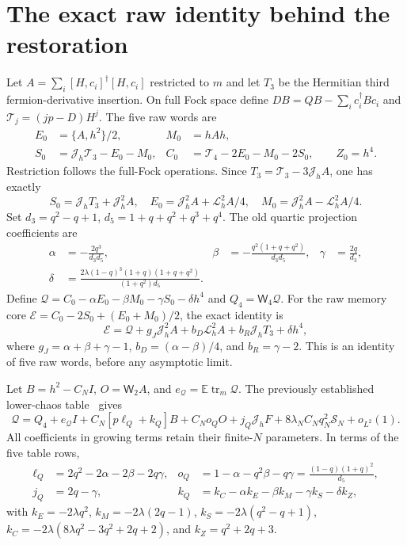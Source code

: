 \documentclass[11pt,a4paper]{article}
\newcommand{\EE}{\mathbb E}
\newcommand{\tr}{\operatorname{tr}}
\newcommand{\W}[1]{\mathsf W_{#1}}
\newcommand{\Jh}{\mathcal J_h}
\newcommand{\Lh}{\mathcal L_h}
\begin{document}
\section{The exact raw identity behind the restoration}
Let $A=\sum_i[H,c_i]^\dagger[H,c_i]$ restricted to $m$ and let
$T_3$ be the Hermitian third fermion-derivative insertion. On full
Fock space define $D B=QB-\sum_i c_i^\dagger Bc_i$ and
$\mathcal T_j=(jp-D)H^j$. The five raw words are
\begin{align}
 E_0&=\{A,h^2\}/2,& M_0&=hAh,\\
 S_0&=\Jh\mathcal T_3-E_0-M_0,&
 C_0&=\mathcal T_4-2E_0-M_0-2S_0,\qquad Z_0=h^4.
\end{align}
Restriction follows the full-Fock operations. Since
$T_3=\mathcal T_3-3\Jh A$, one has exactly
\begin{equation}
 S_0=\Jh T_3+\Jh^2 A,\quad
 E_0=\Jh^2A+\Lh^2A/4,\quad M_0=\Jh^2A-\Lh^2A/4.
\end{equation}
Set $d_3=q^2-q+1$, $d_5=1+q+q^2+q^3+q^4$. The old quartic
projection coefficients are
\begin{align}
 \alpha&=-\frac{2q^3}{d_3d_5},&
 \beta&=-\frac{q^2(1+q+q^2)}{d_3d_5},&
 \gamma&=\frac{2q}{d_3},\\
 \delta&=\frac{2\lambda(1-q)^3(1+q)(1+q+q^2)}{(1+q^2)d_5}.
\end{align}
Define $\mathcal Q=C_0-\alpha E_0-\beta M_0-\gamma S_0-\delta h^4$
and $Q_4=\W4\mathcal Q$. For the raw memory core
$\mathcal E=C_0-2S_0+(E_0+M_0)/2$, the exact identity is
\begin{equation}
 \mathcal E=\mathcal Q+g_J\Jh^2A+b_D\Lh^2A+b_R\Jh T_3+\delta h^4,
 \label{exact}
\end{equation}
where $g_J=\alpha+\beta+\gamma-1$,
$b_D=(\alpha-\beta)/4$, and $b_R=\gamma-2$.
This is an identity of five raw words, before any asymptotic limit.

Let $B=h^2-C_NI$, $O=\W2A$, and $e_{\mathcal Q}=\EE\tr_m\mathcal Q$.
The previously established lower-chaos table~\cite{desc} gives
\begin{equation}
 \mathcal Q=Q_4+e_{\mathcal Q}I
 +C_N[p\ell_Q+k_Q]B+C_No_QO+j_Q\Jh F
 +8\lambda_NC_Nq_N^2\mathcal S_N+o_{L^2}(1). \label{low}
\end{equation}
All coefficients in growing terms retain their finite-$N$ parameters.
In terms of the five table rows,
\begin{align}
 \ell_Q&=2q^2-2\alpha-2\beta-2q\gamma,&
 o_Q&=1-\alpha-q^2\beta-q\gamma=\frac{(1-q)(1+q)^2}{d_5},\\
 j_Q&=2q-\gamma,&
 k_Q&=k_C-\alpha k_E-\beta k_M-\gamma k_S-\delta k_Z,
\end{align}
with $k_E=-2\lambda q^2$, $k_M=-2\lambda(2q-1)$,
$k_S=-2\lambda(q^2-q+1)$,
$k_C=-2\lambda(8\lambda q^2-3q^2+2q+2)$,
and $k_Z=q^2+2q+3$.
\end{document}
